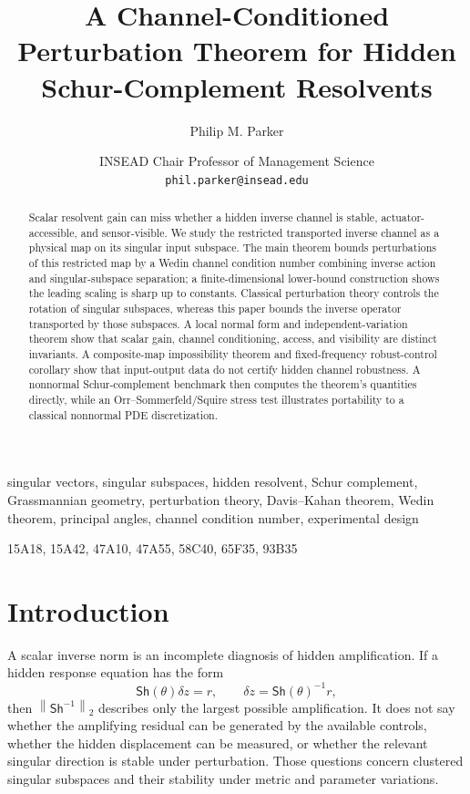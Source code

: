\documentclass[review]{siamart220329}
\title{A Channel-Conditioned Perturbation Theorem for Hidden Schur-Complement Resolvents}
\author{Philip M. Parker}
\date{INSEAD Chair Professor of Management Science\\\texttt{phil.parker@insead.edu}}
\theoremstyle{definition}
\theoremstyle{remark}
\newcommand{\Sh}{\mathsf{Sh}}
\newcommand{\norm}[1]{\left\lVert #1\right\rVert}
\begin{document}
\maketitle

\begin{abstract}
Scalar resolvent gain can miss whether a hidden inverse channel is stable,
actuator-accessible, and sensor-visible. We study the restricted transported
inverse channel as a physical map on its singular input subspace. The main
theorem bounds perturbations of this restricted map by a Wedin channel condition
number combining inverse action and singular-subspace separation; a
finite-dimensional lower-bound construction shows the leading scaling is sharp
up to constants. Classical perturbation theory controls the rotation of singular
subspaces, whereas this paper bounds the inverse operator transported by those
subspaces. A local normal form and independent-variation theorem show that
scalar gain, channel conditioning, access, and visibility are distinct
invariants. A composite-map impossibility theorem and fixed-frequency
robust-control corollary show that input-output data do not certify hidden
channel robustness. A nonnormal Schur-complement benchmark then computes the
theorem's quantities directly, while an Orr--Sommerfeld/Squire stress test
illustrates portability to a classical nonnormal PDE discretization.
\end{abstract}

\begin{keywords}
singular vectors, singular subspaces, hidden resolvent, Schur complement, Grassmannian geometry, perturbation theory, Davis--Kahan theorem, Wedin theorem, principal angles, channel condition number, experimental design
\end{keywords}

\begin{AMS}
15A18, 15A42, 47A10, 47A55, 58C40, 65F35, 93B35
\end{AMS}

\section{Introduction}

A scalar inverse norm is an incomplete diagnosis of hidden amplification. If a hidden response equation has the form
\begin{equation}
    \Sh(\theta)\delta z=r,
    \qquad \delta z=\Sh(\theta)^{-1}r,
    \label{eq:hidden-response}
\end{equation}
then $\norm{\Sh^{-1}}_2$ describes only the largest possible amplification. It does not say whether the amplifying residual can be generated by the available controls, whether the hidden displacement can be measured, or whether the relevant singular direction is stable under perturbation. Those questions concern clustered singular subspaces and their stability under metric and parameter variations.
\end{document}
